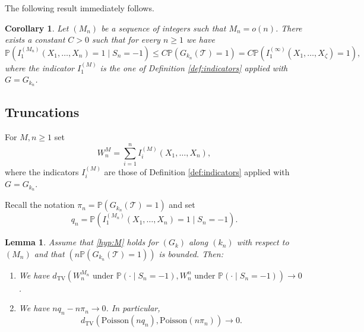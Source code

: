 \documentclass[a4paper,11pt]{article}
\newtheorem{lemma}[theorem]{Lemma}
\newtheorem{corollary}[theorem]{Corollary}
\DeclareRobustCommand{\P}{\mathbb{P}}
\DeclareRobustCommand{\1}{\mathbf{1}}
\newcommand{\dTV}{d_{\mathrm{TV}}}
\newcommand{\Po}{\mathrm{Poisson}}
\begin{document}
The following result immediately follows.
\begin{corollary}
\label{cor:pip}
 Let $(M_{n})$ be a sequence of integers such that $M_n =o(n)$. There exists a constant $C>0$ such that for every $n \geq 1$ we have
$$\P(I^{(M_{n})}_{1}(X_{1}, \ldots,X_{n})=1 \mid S_{n}=-1) \leq  C\P(G_{k_{n}}( \mathcal{T})=1)=C\P(I^{(\infty)}_{1}(X_{1}, \ldots,X_{\zeta})=1),
$$
where the indicator $I_1^{(M)}$ is the one of Definition
\ref{def:indicators} applied with $G=G_{k_n}$.
\end{corollary}



 \subsection{Truncations}
 \label{ssec:truncate}
For $M, n \geq 1$ set
$$W^{M}_{n}= \sum_{i=1}^{n} I^{(M)}_{i}(X_{1}, \ldots,X_{n}),$$
  where the indicators $I_i^{(M)}$ are those of Definition
\ref{def:indicators} applied with $G=G_{k_n}$.

Recall the notation $\pi_n=\P(G_{k_n}(\mathcal T)=1)$ and set 
$$q_n=\P(I^{(M_n)}_1(X_1,\ldots,X_n)=1\mid S_n=-1).$$


\begin{lemma}
\label{lem:truncate}
Assume that \ref{hyp:M} holds for $(G_k)$ along $(k_{n})$ with respect to $(M_{n})$ and that $(n\P(G_{k_n}(\mathcal T)=1))$ is bounded. 
Then:
\begin{enumerate}
\item[(i)] We have
$
\dTV \left( W^{M_n}_{n} \textrm{ under } \P(\cdot\mid S_n=-1),
W^{n}_{n} \textrm{ under } \P(\cdot\mid S_n=-1)\right)\to0
$.
\item[(ii)] We have $nq_n-n\pi_n\to0$. In particular,
$$
\dTV(\Po(nq_n),\Po(n\pi_n))\to0.
$$
\end{enumerate}
\end{lemma}
  
\end{document}
